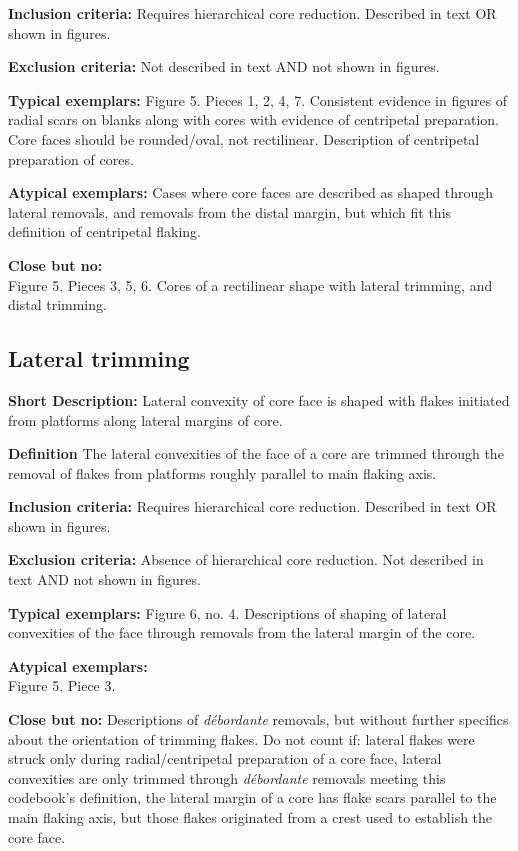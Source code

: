 \documentclass[
]{article}
\begin{document}
\textbf{Inclusion criteria:} Requires hierarchical core reduction.
Described in text OR shown in figures.

\textbf{Exclusion criteria:} Not described in text AND not shown in
figures.

\textbf{Typical exemplars:} Figure 5. Pieces 1, 2, 4, 7. Consistent
evidence in figures of radial scars on blanks along with cores with
evidence of centripetal preparation. Core faces should be rounded/oval,
not rectilinear. Description of centripetal preparation of cores.

\textbf{Atypical exemplars:} Cases where core faces are described as
shaped through lateral removals, and removals from the distal margin,
but which fit this definition of centripetal flaking.

\textbf{Close but no:}\\
Figure 5. Pieces 3, 5, 6. Cores of a rectilinear shape with lateral
trimming, and distal trimming.

\hypertarget{lateral-trimming}{%
\subsection{Lateral trimming}\label{lateral-trimming}}

\textbf{Short Description:} Lateral convexity of core face is shaped
with flakes initiated from platforms along lateral margins of core.

\textbf{Definition} The lateral convexities of the face of a core are
trimmed through the removal of flakes from platforms roughly parallel to
main flaking axis.

\textbf{Inclusion criteria:} Requires hierarchical core reduction.
Described in text OR shown in figures.

\textbf{Exclusion criteria:} Absence of hierarchical core reduction. Not
described in text AND not shown in figures.

\textbf{Typical exemplars:} Figure 6, no. 4. Descriptions of shaping of
lateral convexities of the face through removals from the lateral margin
of the core.

\textbf{Atypical exemplars:}\\
Figure 5. Piece 3.

\textbf{Close but no:} Descriptions of \emph{débordante} removals, but
without further specifics about the orientation of trimming flakes. Do
not count if: lateral flakes were struck only during radial/centripetal
preparation of a core face, lateral convexities are only trimmed through
\emph{débordante} removals meeting this codebook's definition, the
lateral margin of a core has flake scars parallel to the main flaking
axis, but those flakes originated from a crest used to establish the
core face.
\end{document}
